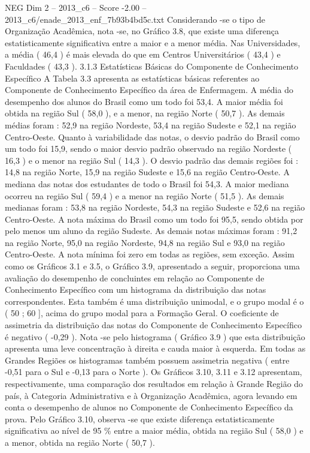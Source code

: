 \begin{textsample}{NEG Dim 2 – 2013\_c6 – Score -2.00 – 2013\_c6/enade\_2013\_enf\_7b93b4bd5c.txt}
Considerando -se o tipo de Organização Acadêmica, nota -se, no Gráfico 3.8, que existe uma diferença estatisticamente significativa entre a maior e a menor média.
Nas Universidades, a média ( 46,4 ) é mais elevada do que em Centros Universitários ( 43,4 ) e Faculdades ( 43,3 ). 3.1.3 Estatísticas Básicas do Componente de Conhecimento Específico A Tabela 3.3 apresenta as estatísticas básicas referentes ao Componente de Conhecimento Específico da área de Enfermagem.
A média do desempenho dos alunos do Brasil como um todo foi 53,4.
A maior média foi obtida na região Sul ( 58,0 ), e a menor, na região Norte ( 50,7 ).
As demais médias foram : 52,9 na região Nordeste, 53,4 na região Sudeste e 52,1 na região Centro-Oeste.
Quanto à variabilidade das notas, o desvio padrão do Brasil como um todo foi 15,9, sendo o maior desvio padrão observado na região Nordeste ( 16,3 ) e o menor na região Sul ( 14,3 ).
O desvio padrão das demais regiões foi : 14,8 na região Norte, 15,9 na região Sudeste e 15,6 na região Centro-Oeste.
A mediana das notas dos estudantes de todo o Brasil foi 54,3.
A maior mediana ocorreu na região Sul ( 59,4 ) e a menor na região Norte ( 51,5 ).
As demais medianas foram : 53,8 na região Nordeste, 54,3 na região Sudeste e 52,6 na região Centro-Oeste.
A nota máxima do Brasil como um todo foi 95,5, sendo obtida por pelo menos um aluno da região Sudeste.
As demais notas máximas foram : 91,2 na região Norte, 95,0 na região Nordeste, 94,8 na região Sul e 93,0 na região Centro-Oeste.
A nota mínima foi zero em todas as regiões, sem exceção.
Assim como os Gráficos 3.1 e 3.5, o Gráfico 3.9, apresentado a seguir, proporciona uma avaliação do desempenho de concluintes em relação ao Componente de Conhecimento Específico com um histograma da distribuição das notas correspondentes.
Esta também é uma distribuição unimodal, e o grupo modal é o ( 50 ; 60 ], acima do grupo modal para a Formação Geral.
O coeficiente de assimetria da distribuição das notas do Componente de Conhecimento Específico é negativo ( -0,29 ).
Nota -se pelo histograma ( Gráfico 3.9 ) que esta distribuição apresenta uma leve concentração à direita e cauda maior à esquerda.
Em todas as Grandes Regiões os histogramas também possuem assimetria negativa ( entre -0,51 para o Sul e -0,13 para o Norte ).
Os Gráficos 3.10, 3.11 e 3.12 apresentam, respectivamente, uma comparação dos resultados em relação à Grande Região do país, à Categoria Administrativa e à Organização Acadêmica, agora levando em conta o desempenho de alunos no Componente de Conhecimento Específico da prova.
Pelo Gráfico 3.10, observa -se que existe diferença estatisticamente significativa ao nível de 95 \% entre a maior média, obtida na região Sul ( 58,0 ) e a menor, obtida na região Norte ( 50,7 ).

\end{textsample}

